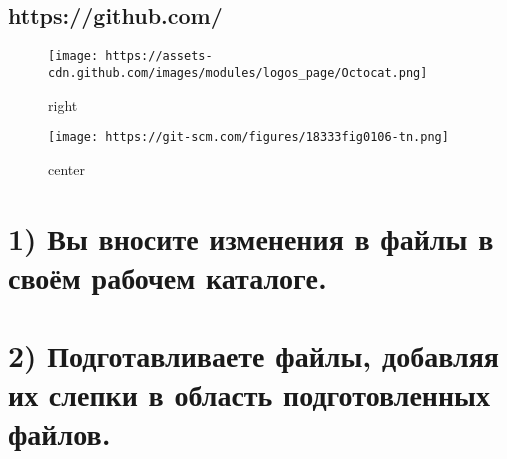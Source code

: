 \documentclass[11pt]{article}
\makeatletter
\def\maxwidth{\ifdim\Gin@nat@width>\linewidth\linewidth
    \else\Gin@nat@width\fi}
\let\Oldincludegraphics\includegraphics
\renewcommand{\includegraphics}[1]{\Oldincludegraphics[width=.8\maxwidth]{#1}}
\makeatother
\begin{document}
\hypertarget{httpsgithub.com}{%
\subsection{https://github.com/}\label{httpsgithub.com}}

\begin{figure}
\centering
\texttt{[image: https://assets-cdn.github.com/images/modules/logos\_page/Octocat.png]}
\caption{right}
\end{figure}

    \begin{figure}
\centering
\texttt{[image: https://git-scm.com/figures/18333fig0106-tn.png]}
\caption{center}
\end{figure}

    \hypertarget{ux432ux44b-ux432ux43dux43eux441ux438ux442ux435-ux438ux437ux43cux435ux43dux435ux43dux438ux44f-ux432-ux444ux430ux439ux43bux44b-ux432-ux441ux432ux43eux451ux43c-ux440ux430ux431ux43eux447ux435ux43c-ux43aux430ux442ux430ux43bux43eux433ux435.}{%
\section{1) Вы вносите изменения в файлы в своём рабочем
каталоге.}\label{ux432ux44b-ux432ux43dux43eux441ux438ux442ux435-ux438ux437ux43cux435ux43dux435ux43dux438ux44f-ux432-ux444ux430ux439ux43bux44b-ux432-ux441ux432ux43eux451ux43c-ux440ux430ux431ux43eux447ux435ux43c-ux43aux430ux442ux430ux43bux43eux433ux435.}}

\hypertarget{ux43fux43eux434ux433ux43eux442ux430ux432ux43bux438ux432ux430ux435ux442ux435-ux444ux430ux439ux43bux44b-ux434ux43eux431ux430ux432ux43bux44fux44f-ux438ux445-ux441ux43bux435ux43fux43aux438-ux432-ux43eux431ux43bux430ux441ux442ux44c-ux43fux43eux434ux433ux43eux442ux43eux432ux43bux435ux43dux43dux44bux445-ux444ux430ux439ux43bux43eux432.}{%
\section{2) Подготавливаете файлы, добавляя их слепки в область
подготовленных
файлов.}\label{ux43fux43eux434ux433ux43eux442ux430ux432ux43bux438ux432ux430ux435ux442ux435-ux444ux430ux439ux43bux44b-ux434ux43eux431ux430ux432ux43bux44fux44f-ux438ux445-ux441ux43bux435ux43fux43aux438-ux432-ux43eux431ux43bux430ux441ux442ux44c-ux43fux43eux434ux433ux43eux442ux43eux432ux43bux435ux43dux43dux44bux445-ux444ux430ux439ux43bux43eux432.}}
\end{document}

